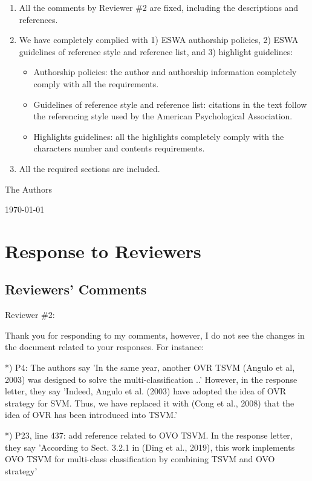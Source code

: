 \documentclass[12pt, review, authoryear]{elsarticle}
\def\mycoauthor{The Authors}
\def\mydate{\today} %
\begin{document}
\begin{enumerate}
\item All the comments by Reviewer \#2 are fixed, including the descriptions and references.
\item We have completely complied with 1) ESWA authorship policies,
2) ESWA guidelines of reference style and reference list, and
3) highlight guidelines:
  \begin{itemize}
    \item Authorship policies: the author and authorship information completely comply with all the requirements.
    \item Guidelines of reference style and reference list: citations in the text follow the referencing style used by the American Psychological Association.
    \item Highlights guidelines: all the highlights completely comply with the characters  number and contents requirements.
  \end{itemize}
\item All the required sections are included.
\end{enumerate}


\noindent \mycoauthor

\noindent \mydate


\section{Response to Reviewers}
\subsection{Reviewers' Comments}


Reviewer \#2:

Thank you for responding to my comments, however, I do not see the changes in the document related to your responses. For instance:

*) P4: The authors say 'In the same year, another OVR TSVM (Angulo et al, 2003) was designed to solve the multi-classification ..' However, in the response letter, they say 'Indeed, Angulo et al. (2003) have adopted the idea of OVR strategy for SVM. Thus, we have replaced it with (Cong et al., 2008) that the idea of OVR has been introduced into TSVM.'

*) P23, line 437: add reference related to OVO TSVM. In the response letter, they say 'According to Sect. 3.2.1 in (Ding et al., 2019), this work implements OVO TSVM for multi-class classification by combining TSVM and OVO strategy'
\end{document}
